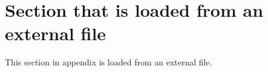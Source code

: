 \section{Section that is loaded from an external file}
This section in appendix is loaded from an external file.
